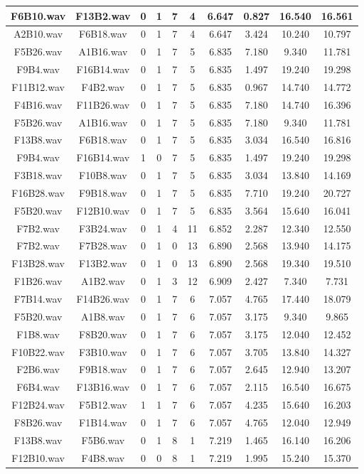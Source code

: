 \documentclass[11pt,a4paper]{book}
\begin{document}
\begin{longtable}[c]{|c|c|c|c|c|c|c|c|c|c|}
F6B10.wav&F13B2.wav&0&1&7&4&6.647&0.827&16.540&16.561\\ \hline
A2B10.wav&F6B18.wav&0&1&7&4&6.647&3.424&10.240&10.797\\ \hline
F5B26.wav&A1B16.wav&0&1&7&5&6.835&7.180&9.340&11.781\\ \hline
F9B4.wav&F16B14.wav&0&1&7&5&6.835&1.497&19.240&19.298\\ \hline
F11B12.wav&F4B2.wav&0&1&7&5&6.835&0.967&14.740&14.772\\ \hline
F4B16.wav&F11B26.wav&0&1&7&5&6.835&7.180&14.740&16.396\\ \hline
F5B26.wav&A1B16.wav&0&1&7&5&6.835&7.180&9.340&11.781\\ \hline
F13B8.wav&F6B18.wav&0&1&7&5&6.835&3.034&16.540&16.816\\ \hline
F9B4.wav&F16B14.wav&1&0&7&5&6.835&1.497&19.240&19.298\\ \hline
F3B18.wav&F10B8.wav&0&1&7&5&6.835&3.034&13.840&14.169\\ \hline
F16B28.wav&F9B18.wav&0&1&7&5&6.835&7.710&19.240&20.727\\ \hline
F5B20.wav&F12B10.wav&0&1&7&5&6.835&3.564&15.640&16.041\\ \hline
F7B2.wav&F3B24.wav&0&1&4&11&6.852&2.287&12.340&12.550\\ \hline
F7B2.wav&F7B28.wav&0&1&0&13&6.890&2.568&13.940&14.175\\ \hline
F13B28.wav&F13B2.wav&0&1&0&13&6.890&2.568&19.340&19.510\\ \hline
F1B26.wav&A1B2.wav&0&1&3&12&6.909&2.427&7.340&7.731\\ \hline
F7B14.wav&F14B26.wav&0&1&7&6&7.057&4.765&17.440&18.079\\ \hline
F5B20.wav&A1B8.wav&0&1&7&6&7.057&3.175&9.340&9.865\\ \hline
F1B8.wav&F8B20.wav&0&1&7&6&7.057&3.175&12.040&12.452\\ \hline
F10B22.wav&F3B10.wav&0&1&7&6&7.057&3.705&13.840&14.327\\ \hline
F2B6.wav&F9B18.wav&0&1&7&6&7.057&2.645&12.940&13.207\\ \hline
F6B4.wav&F13B16.wav&0&1&7&6&7.057&2.115&16.540&16.675\\ \hline
F12B24.wav&F5B12.wav&1&1&7&6&7.057&4.235&15.640&16.203\\ \hline
F8B26.wav&F1B14.wav&0&1&7&6&7.057&4.765&12.040&12.949\\ \hline
F13B8.wav&F5B6.wav&0&1&8&1&7.219&1.465&16.140&16.206\\ \hline
F12B10.wav&F4B8.wav&0&0&8&1&7.219&1.995&15.240&15.370\\ \hline

\end{longtable}
\end{document}
